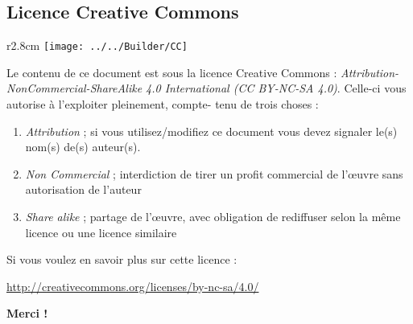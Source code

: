 \subsection*{Licence Creative Commons}
\begin{wrapfigure}[3]{r}{2.8cm}
	\texttt{[image: ../../Builder/CC]}
\end{wrapfigure}
Le contenu de ce document est sous la licence Creative Commons : \textit{Attribution-NonCommercial-ShareAlike 
4.0 International (CC BY-NC-SA 4.0)}. Celle-ci vous autorise à l'exploiter pleinement, compte-
tenu de trois choses :
\begin{enumerate}
	\item \textit{Attribution} ; si vous utilisez/modifiez ce document vous devez signaler le(s) nom(s)
	      de(s) auteur(s).
	\item \textit{Non Commercial} ; interdiction de tirer un profit commercial de l’œuvre sans 
	      autorisation de l'auteur 
	\item \textit{Share alike} ;  partage de l’œuvre, avec obligation de rediffuser selon la même 
	      licence ou une licence similaire
\end{enumerate}
Si vous voulez en savoir plus sur cette licence :
\begin{center}
	\url{http://creativecommons.org/licenses/by-nc-sa/4.0/}
\end{center}

\begin{flushright}
	\textbf{Merci ! }
\end{flushright}